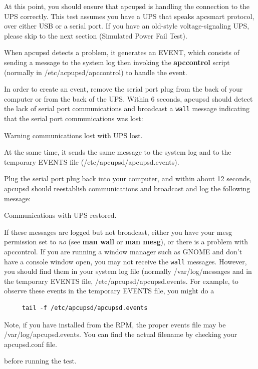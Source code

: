 \label{index-Testing_002c-Communications-91}
\label{index-Communications-Testing-92}
At this point, you should ensure that apcupsd is handling the connection to
the UPS correctly. This test assumes you have a UPS that speaks apcsmart
protocol, over either USB or a serial port.  If you have an old-style
voltage-signaling UPS, please skip to the next section (Simulated Power Fail
Test).  

When apcupsd detects a problem, it generates an EVENT, which consists of
sending a message to the system log then invoking the {\bf apccontrol} script
(normally in /etc/acpupsd/apccontrol) to handle the event.  

In order to create an event, remove the serial port plug from the back of your
computer or from the back of the UPS. Within 6 seconds, apcupsd should detect
the lack of serial port communications and broadcast a {\tt wall} message
indicating that the serial port communications was lost:  

Warning communications lost with UPS lost.  

At the same time, it sends the same message to the system log and to the
temporary EVENTS file (/etc/apcupsd/apcupsd.events).  

Plug the serial port plug back into your computer, and within about 12
seconds, apcupsd should reestablish communications and broadcast and log the
following message:  

Communications with UPS restored.  

If these messages are logged but not broadcast, either you have your mesg
permission set to {\it no} (see {\bf man wall} or {\bf man mesg}), or there is
a problem with apccontrol. If you are running a window manager such as GNOME
and don't have a console window open, you may not receive the {\tt wall}
messages. However, you should find them in your system log file (normally
/var/log/messages and in the temporary EVENTS file,
/etc/apcupsd/apcupsd.events. For example, to observe these events in the
temporary EVENTS file, you might do a 

\footnotesize
\begin{verbatim}
     tail -f /etc/apcupsd/apcupsd.events
\end{verbatim}
\normalsize

Note, if you have installed from the RPM, the proper events file may be
/var/log/apcupsd.events. You can find the actual filename by checking your
apcupsd.conf file.  

before running the test.  


